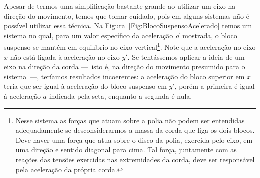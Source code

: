 Apesar de termos uma simplificação bastante grande ao utilizar um eixo na direção do movimento, temos que tomar cuidado, pois em alguns sistemas não é possível utilizar essa técnica. Na Figura~\ref{Fig:BlocoSuspensoAcelerado} temos um sistema no qual, para um valor específico da aceleração $\vec{a}$ mostrada, o bloco suspenso se mantém em equilíbrio no eixo vertical\footnote[][-2cm]{Nesse sistema as forças que atuam sobre a polia não podem ser entendidas adequadamente se desconsiderarmos a massa da corda que liga os dois blocos. Deve haver uma força que atua sobre o disco da polia, exercida pelo eixo, em uma direção e sentido diagonal para cima. Tal força, juntamente com as reações das tensões exercidas nas extremidades da corda, deve ser responsável pela aceleração da própria corda.}. Note que a aceleração no eixo $x$ não está ligada à aceleração no eixo $y'$. Se tentássemos aplicar a ideia de um eixo na direção da corda ---~isto é, na direção do movimento presumido para o sistema~---, teríamos resultados incoerentes: a aceleração do bloco superior em $x$ teria que ser igual à aceleração do bloco suspenso em $y'$, porém a primeira é igual à aceleração $a$ indicada pela seta, enquanto a segunda é nula.


